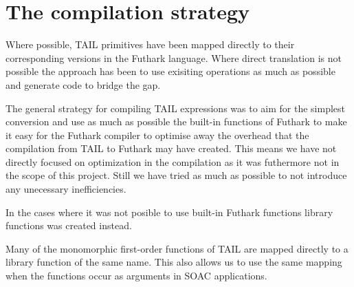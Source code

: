 \documentclass[11pt]{article}
\begin{document}


\section{The compilation strategy}
\label{sec:strategy}
Where possible, TAIL primitives have been mapped directly to their corresponding versions in the Futhark language.
Where direct translation is not possible the approach has been to use exisiting operations as much
as possible and generate code to bridge the gap.



The general strategy for compiling TAIL expressions was to aim for the simplest conversion and use as much as possible 
the built-in functions of Futhark to make it easy for the Futhark compiler to optimise away the overhead that the compilation from TAIL to Futhark may have created.
This means we have not directly focused on optimization in the compilation as it was futhermore not in the scope of this project.
Still we have tried as much as possible to not introduce any unecessary inefficiencies.

In the cases where it was not posible to use built-in Futhark functions library functions was created instead. 

Many of the monomorphic first-order functions of TAIL are mapped directly to a library function of the same name. This also allows us to use the same mapping when the functions occur as arguments in SOAC applications.

\end{document}
